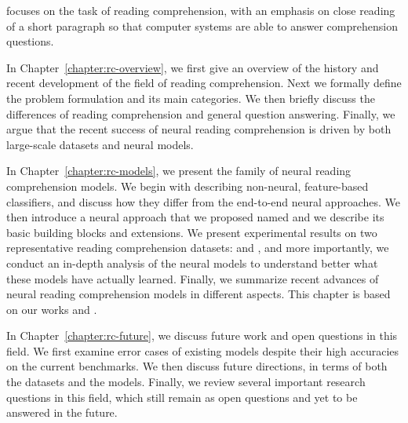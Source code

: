  focuses on the task of reading comprehension, with an emphasis on close reading of a short paragraph so that computer systems are able to answer comprehension questions.
\begin{description}
    \item In Chapter~\ref{chapter:rc-overview}, we first give an overview of the history and recent development of the field of reading comprehension. Next we formally define the problem formulation and its main categories. We then briefly discuss the differences of reading comprehension and general question answering.  Finally, we argue that the recent success of neural reading comprehension is driven by both large-scale datasets and neural models.
    \item In Chapter~\ref{chapter:rc-models}, we present the family of neural reading comprehension models. We begin with describing non-neural, feature-based classifiers, and discuss how they differ from the end-to-end neural approaches. We then introduce a neural approach that we proposed named  and we describe its basic building blocks and extensions. We present experimental results on two representative reading comprehension datasets:  and , and more importantly, we conduct an in-depth analysis of the neural models to understand better what these models have actually learned. Finally, we summarize recent advances of neural reading comprehension models in different aspects. This chapter is based on our works \cite{chen2016thorough} and \cite{chen2017reading}.
    \item In Chapter~\ref{chapter:rc-future}, we discuss future work and open questions in this field. We first examine error cases of existing models despite their high accuracies on the current benchmarks. We then discuss future directions, in terms of both the datasets and the models. Finally, we review several important research questions in this field, which still remain as open questions and yet to be answered in the future.
\end{description}

